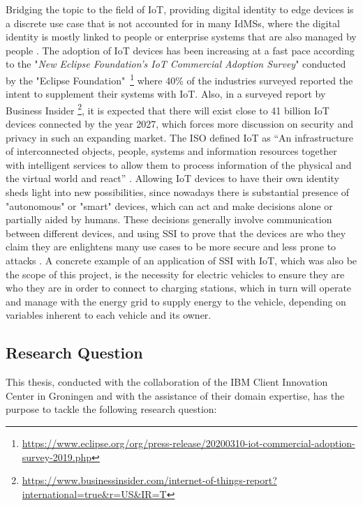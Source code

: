 Bridging the topic to the field of \acrfull{IoT}, providing digital identity to edge devices is a discrete use case that is not accounted for in many \glspl{IdMS}, where the digital identity is mostly linked to people or enterprise systems that are also managed by people \cite{luecking2020decentralized}.
The adoption of IoT devices has been increasing at a fast pace according to the "\textit{New Eclipse Foundation’s IoT Commercial Adoption Survey}" conducted by the "Eclipse Foundation"~\footnote{\url{https://www.eclipse.org/org/press-release/20200310-iot-commercial-adoption-survey-2019.php}} where 40\% of the industries surveyed reported the intent to supplement their systems with IoT. 
Also, in a surveyed report by Business Insider \footnote{\url{https://www.businessinsider.com/internet-of-things-report?international=true&r=US&IR=T}}, it is expected that there will exist close to 41 billion IoT devices connected by the year 2027, which forces more discussion on security and privacy in such an expanding market.
The \acrfull{ISO} defined IoT as “An infrastructure of interconnected objects, people, systems and information resources together with intelligent services to allow them to process information of the physical and the virtual world and react” \cite{ISO/IEC2015}. 
Allowing IoT devices to have their own identity sheds light into new possibilities, since nowadays there is substantial presence of "autonomous" or "smart" devices, which can act and make decisions alone or partially aided by humans. These decisions generally involve communication between different devices, and using SSI to prove that the devices are who they claim they are enlightens many use cases to be more secure and less prone to attacks \cite{Sybil2018} \cite{terzi2020securing}. 
A concrete example of an application of SSI with IoT, which was also be the scope of this project, is the necessity for electric vehicles to ensure they are who they are in order to connect to charging stations, which in turn will operate and manage with the energy grid to supply energy to the vehicle, depending on variables inherent to each vehicle and its owner.

\subsection{Research Question}
\label{subsec:research_questions}

This thesis, conducted with the collaboration of the IBM Client Innovation Center in Groningen and with the assistance of their domain expertise, has the purpose to tackle the following research question:

